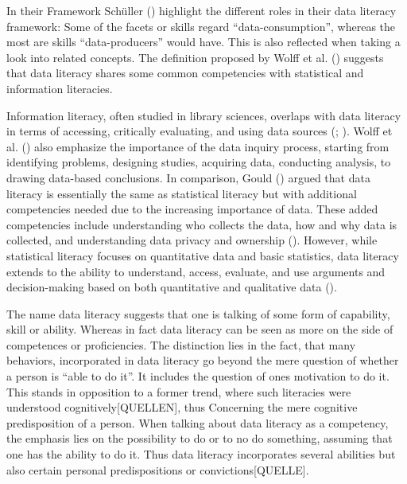 \documentclass[
  12pt,
  a4paper,
  twoside]{article}
\begin{document}
In their Framework Schüller () highlight the different roles in their data literacy framework: Some of the facets or skills regard ``data-consumption'', whereas the most are skills ``data-producers'' would have. This is also reflected when taking a look into related concepts. The definition proposed by Wolff et al. () suggests that data literacy shares some common competencies with statistical and information literacies.

Information literacy, often studied in library sciences, overlaps with data literacy in terms of accessing, critically evaluating, and using data sources (; ). Wolff et al. () also emphasize the importance of the data inquiry process, starting from identifying problems, designing studies, acquiring data, conducting analysis, to drawing data-based conclusions.
In comparison, Gould () argued that data literacy is essentially the same as statistical literacy but with additional competencies needed due to the increasing importance of data. These added competencies include understanding who collects the data, how and why data is collected, and understanding data privacy and ownership ().
However, while statistical literacy focuses on quantitative data and basic statistics, data literacy extends to the ability to understand, access, evaluate, and use arguments and decision-making based on both quantitative and qualitative data ().

The name data literacy suggests that one is talking of some form of capability, skill or ability. Whereas in fact data literacy can be seen as more on the side of competences or proficiencies. The distinction lies in the fact, that many behaviors, incorporated in data literacy go beyond the mere question of whether a person is ``able to do it''. It includes the question of ones motivation to do it. This stands in opposition to a former trend, where such literacies were understood cognitively{[}QUELLEN{]}, thus Concerning the mere cognitive predisposition of a person. When talking about data literacy as a competency, the emphasis lies on the possibility to do or to no do something, assuming that one has the ability to do it. Thus data literacy incorporates several abilities but also certain personal predispositions or convictions{[}QUELLE{]}.
\end{document}
